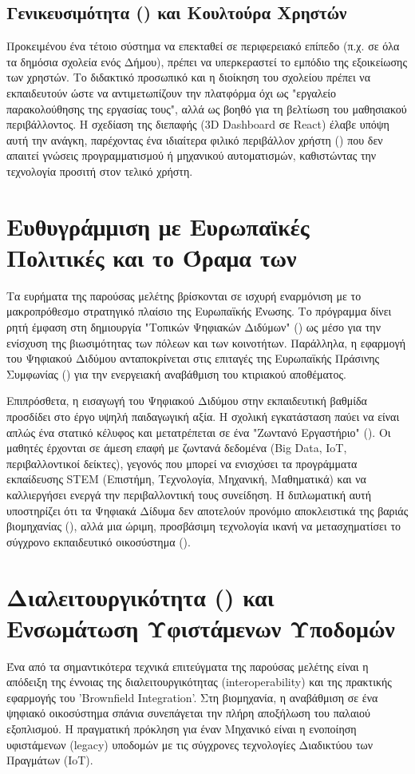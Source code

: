 \subsection{Γενικευσιμότητα () και Κουλτούρα Χρηστών}
Προκειμένου ένα τέτοιο σύστημα να επεκταθεί σε περιφερειακό επίπεδο (π.χ. σε όλα τα δημόσια σχολεία ενός Δήμου), πρέπει να υπερκεραστεί το εμπόδιο της εξοικείωσης των χρηστών. Το διδακτικό προσωπικό και η διοίκηση του σχολείου πρέπει να εκπαιδευτούν ώστε να αντιμετωπίζουν την πλατφόρμα όχι ως "εργαλείο παρακολούθησης της εργασίας τους", αλλά ως βοηθό για τη βελτίωση του μαθησιακού περιβάλλοντος. Η σχεδίαση της διεπαφής (3D Dashboard σε React) έλαβε υπόψη αυτή την ανάγκη, παρέχοντας ένα ιδιαίτερα φιλικό περιβάλλον χρήστη () που δεν απαιτεί γνώσεις προγραμματισμού ή μηχανικού αυτοματισμών, καθιστώντας την τεχνολογία προσιτή στον τελικό χρήστη.

\section{Ευθυγράμμιση με Ευρωπαϊκές Πολιτικές και το Όραμα των }
Τα ευρήματα της παρούσας μελέτης βρίσκονται σε ισχυρή εναρμόνιση με το μακροπρόθεσμο στρατηγικό πλαίσιο της Ευρωπαϊκής Ένωσης. Το πρόγραμμα \textit{} δίνει ρητή έμφαση στη δημιουργία "Τοπικών Ψηφιακών Διδύμων" () ως μέσο για την ενίσχυση της βιωσιμότητας των πόλεων και των κοινοτήτων. Παράλληλα, η εφαρμογή του Ψηφιακού Διδύμου ανταποκρίνεται στις επιταγές της Ευρωπαϊκής Πράσινης Συμφωνίας () για την ενεργειακή αναβάθμιση του κτιριακού αποθέματος.

Επιπρόσθετα, η εισαγωγή του Ψηφιακού Διδύμου στην εκπαιδευτική βαθμίδα προσδίδει στο έργο υψηλή παιδαγωγική αξία. Η σχολική εγκατάσταση παύει να είναι απλώς ένα στατικό κέλυφος και μετατρέπεται σε ένα "Ζωντανό Εργαστήριο" (). Οι μαθητές έρχονται σε άμεση επαφή με ζωντανά δεδομένα (Big Data, IoT, περιβαλλοντικοί δείκτες), γεγονός που μπορεί να ενισχύσει τα προγράμματα εκπαίδευσης STEM (Επιστήμη, Τεχνολογία, Μηχανική, Μαθηματικά) και να καλλιεργήσει ενεργά την περιβαλλοντική τους συνείδηση. Η διπλωματική αυτή υποστηρίζει ότι τα Ψηφιακά Δίδυμα δεν αποτελούν προνόμιο αποκλειστικά της βαριάς βιομηχανίας (), αλλά μια ώριμη, προσβάσιμη τεχνολογία ικανή να μετασχηματίσει το σύγχρονο εκπαιδευτικό οικοσύστημα ().

\section{Διαλειτουργικότητα () και Ενσωμάτωση Υφιστάμενων Υποδομών}
Ένα από τα σημαντικότερα τεχνικά επιτεύγματα της παρούσας μελέτης είναι η απόδειξη της έννοιας της διαλειτουργικότητας (interoperability) και της πρακτικής εφαρμογής του 'Brownfield Integration'. Στη βιομηχανία, η αναβάθμιση σε ένα ψηφιακό οικοσύστημα σπάνια συνεπάγεται την πλήρη αποξήλωση του παλαιού εξοπλισμού. Η πραγματική πρόκληση για έναν Μηχανικό είναι η ενοποίηση υφιστάμενων (legacy) υποδομών με τις σύγχρονες τεχνολογίες Διαδικτύου των Πραγμάτων (IoT).

